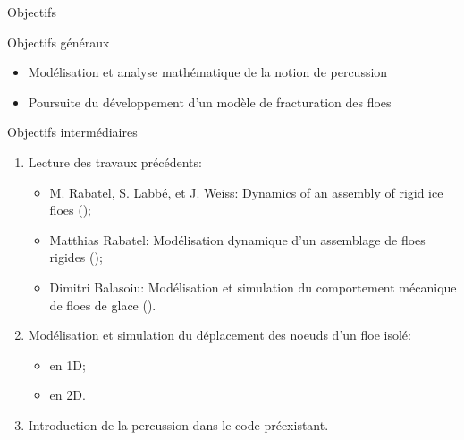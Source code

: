 \begin{frame}{Objectifs}

  \begin{exampleblock}{Objectifs généraux}

    \begin{itemize}
      \item Modélisation et analyse mathématique de la notion de percussion
      \item Poursuite du développement d’un modèle de fracturation des floes
    \end{itemize}
  \end{exampleblock}


  \begin{block}{Objectifs intermédiaires}

    \begin{enumerate}
      \item Lecture des travaux précédents:
      \begin{itemize}
        \item M. Rabatel, S. Labbé, et J. Weiss: Dynamics of an assembly of rigid ice floes (\citeyear{rabatel2015dynamics}); 
        \item Matthias Rabatel: Modélisation dynamique d’un assemblage de floes rigides (\citeyear{rabatel2015modelisation});
        \item Dimitri Balasoiu: Modélisation et simulation du comportement mécanique de floes de glace (\citeyear{balasoiu2020modelisation}).
      \end{itemize}
      
      \item Modélisation et simulation du déplacement des noeuds d'un floe isolé:
      \begin{itemize}
        \item en 1D;
        \item en 2D.
      \end{itemize}

      \item Introduction de la percussion dans le code préexistant.

    \end{enumerate}
  \end{block}

\end{frame}

